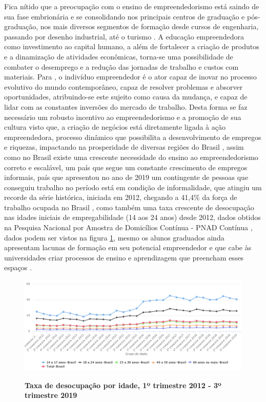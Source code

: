 \newpage


Fica nítido que a preocupação com o ensino de empreendedorismo está saindo de sua fase embrionária e se consolidando nos principais  centros de graduação e pós-graduação, nos mais diversos segmentos de formação desde cursos de engenharia, passando por desenho industrial, até o turismo \cite{henrique_praticas_2008}. A educação empreendedora como investimento ao capital humano, a além de fortalecer a criação de produtos e a dinamização de atividades econômicas, torna-se uma possibilidade de combater o desemprego \cite{morais_empreendedorismo_2018} e a redução das jornadas de trabalho e custos com materiais. Para , o indivíduo empreendedor é o ator capaz de inovar no processo evolutivo do mundo contemporâneo, capaz de resolver problemas e absorver oportunidades, atribuindo-se este sujeito como causa da mudança, e capaz de lidar com as constantes inversões do mercado de trabalho. Desta forma se faz necessário um robusto incentivo ao empreendedorismo e a promoção de sua cultura visto que, a criação de negócios está diretamente ligada à ação empreendedora, processo dinâmico que possibilita a desenvolvimento de empregos e riquezas, impactando na prosperidade de diversas regiões do Brasil \cite{leite_aprendizagem_2015}, assim como no Brasil existe uma crescente necessidade do ensino ao empreendedorismo correto e escalável, um país que segue um constante crescimento de empregos informais, país que apresentou no ano de 2019 um contingente de pessoas que conseguiu trabalho no período está em condição de informalidade, que atingiu um recorde da série histórica, iniciada em 2012, chegando a 41,4\% da força de trabalho ocupada no Brasil \cite{ibge_informalidade_2019}, como também uma taxa crescente de desocupação nas idades iniciais de empregabilidade (14 aos 24 anos) desde 2012, dados obtidos na Pesquisa Nacional por Amostra de Domicílios Contínua - PNAD Contínua \cite{ibge_instituto_brasileiro_de_geografia_e_estatistica_pesquisa_2019}, dados podem ser vistos na figura \ref{figura_2}, mesmo os alunos graduados ainda apresentam lacunas de formação em seu potencial empreendedor e que cabe às universidades criar processos de ensino e aprendizagem que preencham esses espaços \cite{pietrovski_alise_2019}.


\begin{figure}[!htb]
\centering
\caption{\textbf{Taxa de desocupação por idade, 1º trimestre 2012 - 3º trimestre 2019}}
\includegraphics[scale=0.25]{Imagens/taxa_desocupacao.png}
\label{figura_2}
\end{figure}


